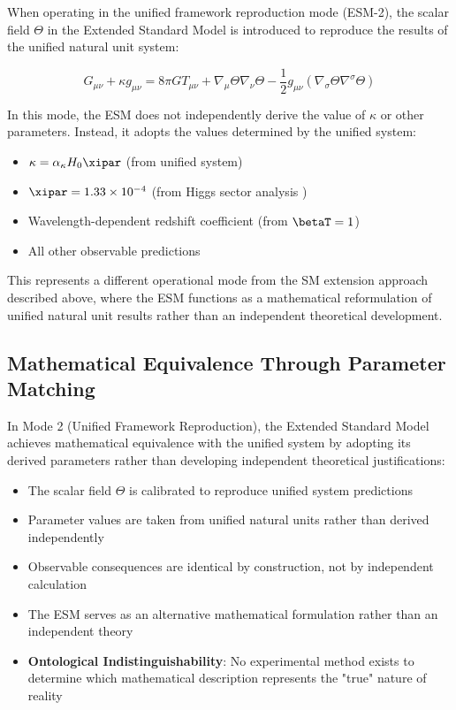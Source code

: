 	When operating in the unified framework reproduction mode (ESM-2), the scalar field $\Theta$ in the Extended Standard Model is introduced to reproduce the results of the unified natural unit system:
	
	\begin{equation}
		G_{\mu\nu} + \kappa g_{\mu\nu} = 8\pi G T_{\mu\nu} + \nabla_{\mu}\Theta\nabla_{\nu}\Theta - \frac{1}{2}g_{\mu\nu}(\nabla_{\sigma}\Theta\nabla^{\sigma}\Theta)
	\end{equation}
	
	In this mode, the ESM does not independently derive the value of $\kappa$ or other parameters. Instead, it adopts the values determined by the unified system:
	
	\begin{itemize}
		\item $\kappa = \alpha_\kappa H_0 \xipar$ (from unified system)
		\item $\xipar = 1.33 \times 10^{-4}$ (from Higgs sector analysis \cite{pascher_beta_derivation_2025})
		\item Wavelength-dependent redshift coefficient (from $\betaT = 1$)
		\item All other observable predictions
	\end{itemize}
	
	This represents a different operational mode from the SM extension approach described above, where the ESM functions as a mathematical reformulation of unified natural unit results rather than an independent theoretical development.
	
	\subsection{Mathematical Equivalence Through Parameter Matching}
	\label{subsec:mathematical_equivalence_parameters}
	
	In Mode 2 (Unified Framework Reproduction), the Extended Standard Model achieves mathematical equivalence with the unified system by adopting its derived parameters rather than developing independent theoretical justifications:
	
	\begin{itemize}
		\item The scalar field $\Theta$ is calibrated to reproduce unified system predictions
		\item Parameter values are taken from unified natural units rather than derived independently
		\item Observable consequences are identical by construction, not by independent calculation
		\item The ESM serves as an alternative mathematical formulation rather than an independent theory
		\item \textbf{Ontological Indistinguishability}: No experimental method exists to determine which mathematical description represents the "true" nature of reality \cite{Duhem1906,Poincare1905}
	\end{itemize}
	
